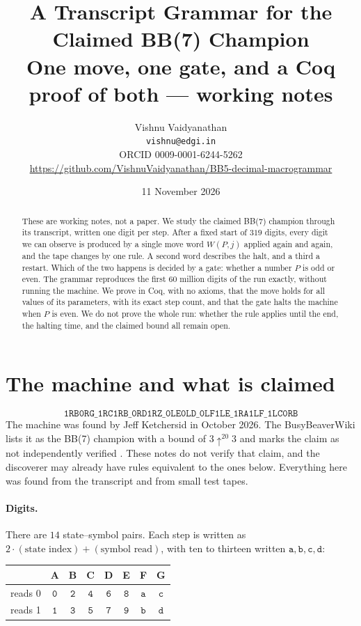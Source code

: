 \documentclass[11pt]{article}
\title{A Transcript Grammar for the Claimed BB(7) Champion\\
\large One move, one gate, and a Coq proof of both --- working notes}
\author{Vishnu Vaidyanathan\\
\small \texttt{vishnu@edgi.in}\\
\small ORCID 0009-0001-6244-5262\\
\small \url{https://github.com/VishnuVaidyanathan/BB5-decimal-macrogrammar}}
\date{11 November 2026}
\theoremstyle{remark}
\newcommand{\w}[1]{\mathtt{#1}}
\begin{document}
\maketitle

\begin{abstract}
These are working notes, not a paper. We study the claimed BB(7) champion
through its transcript, written one digit per step. After a fixed start of
$319$ digits, every digit we can observe is produced by a single move word
$W(P,j)$ applied again and again, and the tape changes by one rule. A second
word describes the halt, and a third a restart. Which of the two happens is
decided by a gate: whether a number $P$ is odd or even. The grammar reproduces
the first $60$ million digits of the run exactly, without running the machine.
We prove in Coq, with no axioms, that the move holds for all values of its
parameters, with its exact step count, and that the gate halts the machine when
$P$ is even. We do not prove the whole run: whether the rule applies until the
end, the halting time, and the claimed bound all remain open.
\end{abstract}

\section{The machine and what is claimed}

\[
\texttt{1RB0RG\_1RC1RB\_0RD1RZ\_0LE0LD\_0LF1LE\_1RA1LF\_1LC0RB}
\]
The machine was found by Jeff Ketchersid in October 2026. The BusyBeaverWiki
lists it as the BB(7) champion with a bound of $3\uparrow^{20}3$ and marks the
claim as not independently verified \cite{wiki}. These notes do not verify that
claim, and the discoverer may already have rules equivalent to the ones below.
Everything here was found from the transcript and from small test tapes.

\paragraph{Digits.} There are $14$ state--symbol pairs. Each step is written as
$2\cdot(\text{state index})+(\text{symbol read})$, with ten to thirteen written
$\w{a},\w{b},\w{c},\w{d}$:

\begin{center}
\begin{tabular}{lccccccc}
\toprule
 & A & B & C & D & E & F & G\\
\midrule
reads 0 & $\w0$ & $\w2$ & $\w4$ & $\w6$ & $\w8$ & $\w{a}$ & $\w{c}$\\
reads 1 & $\w1$ & $\w3$ & $\w5$ & $\w7$ & $\w9$ & $\w{b}$ & $\w{d}$\\
\bottomrule
\end{tabular}
\end{center}
\end{document}
